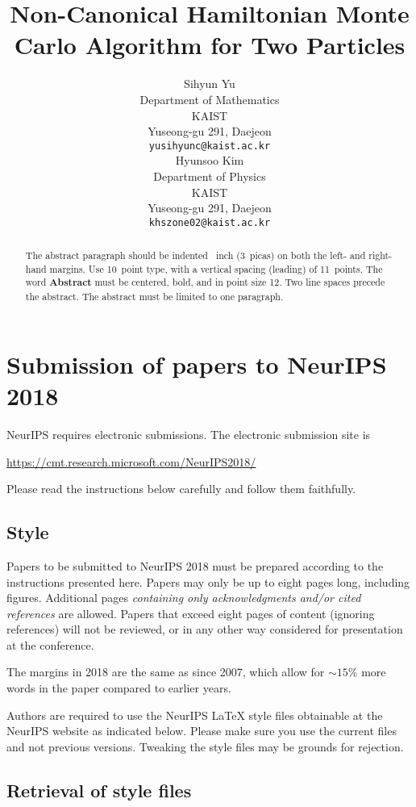 \documentclass{article}
\title{Non-Canonical Hamiltonian Monte Carlo Algorithm for Two Particles}
\author{%
  Sihyun Yu\\
  Department of Mathematics\\
  KAIST\\
  Yuseong-gu 291, Daejeon \\
  \texttt{yusihyunc@kaist.ac.kr} \\
  \And
  Hyunsoo Kim\\
  Department of Physics\\
  KAIST\\
  Yuseong-gu 291, Daejeon \\
  \texttt{khszone02@kaist.ac.kr} \\
  }
\begin{document}

\maketitle

\begin{abstract}
  The abstract paragraph should be indented ~inch (3~picas) on
  both the left- and right-hand margins. Use 10~point type, with a vertical
  spacing (leading) of 11~points.  The word \textbf{Abstract} must be centered,
  bold, and in point size 12. Two line spaces precede the abstract. The abstract
  must be limited to one paragraph.
\end{abstract}

\section{Submission of papers to NeurIPS 2018}

NeurIPS requires electronic submissions.  The electronic submission site is
\begin{center}
  \url{https://cmt.research.microsoft.com/NeurIPS2018/}
\end{center}

Please read the instructions below carefully and follow them faithfully.

\subsection{Style}

Papers to be submitted to NeurIPS 2018 must be prepared according to the
instructions presented here. Papers may only be up to eight pages long,
including figures. Additional pages \emph{containing only acknowledgments and/or
  cited references} are allowed. Papers that exceed eight pages of content
(ignoring references) will not be reviewed, or in any other way considered for
presentation at the conference.

The margins in 2018 are the same as since 2007, which allow for $\sim$$15\%$
more words in the paper compared to earlier years.

Authors are required to use the NeurIPS \LaTeX{} style files obtainable at the
NeurIPS website as indicated below. Please make sure you use the current files
and not previous versions. Tweaking the style files may be grounds for
rejection.

\subsection{Retrieval of style files}
\end{document}
